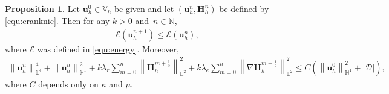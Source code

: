 \documentclass[11pt, reqno]{amsart}
\theoremstyle{definition}
\newtheorem{proposition}[theorem]{Proposition}
\theoremstyle{remark}
\numberwithin{equation}{section}
\newcommand{\bff}{\boldsymbol}
\newcommand{\bb}{\mathbb}
\newcommand{\norm}[2]{\left\|{#1}\right\|_{#2}}
\begin{document}
\begin{proposition}\label{pro:ene dec H1 crank}
Let $\bff{u}_h^0 \in \bb{V}_h$ be given and let $\left(\bff{u}_h^n, \bff{H}_h^n\right)$ be defined by
\eqref{equ:cranknic}. Then for any $k>0$ and~$n\in \bb{N}$,
\begin{align}\label{equ:ene decrease}
		\mathcal{E}(\bff{u}_h^{n+1}) \leq \mathcal{E}(\bff{u}_h^n),
\end{align}
where $\mathcal{E}$ was defined in \eqref{equ:energy}. Moreover,
\begin{align}\label{equ:stab L4 H1}
	\norm{\bff{u}_h^n}{\bb{L}^4}^4
	+
	\norm{\bff{u}_h^n}{\bb{H}^1}^2
	+
	k\lambda_r \sum_{m=0}^n \norm{\bff{H}_h^{m+\frac{1}{2}}}{\bb{L}^2}^2
	+
	k\lambda_e \sum_{m=0}^n \norm{\nabla \bff{H}_h^{m+\frac{1}{2}}}{\bb{L}^2}^2
	\leq
	C \left( \norm{\bff{u}_h^0}{\bb{H}^1}^2 + |\mathscr{D}| \right),
\end{align}
where $C$ depends only on $\kappa$ and $\mu$.
\end{proposition}
\end{document}
